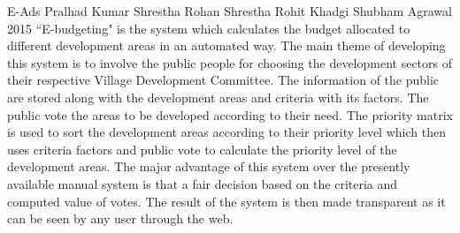 \begin{conf-abstract}[]
{E-Ads}
{
Pralhad Kumar Shrestha
Rohan Shrestha
Rohit Khadgi
Shubham Agrawal
}
{2015}
``E-budgeting" is the system which calculates the budget allocated to different development areas in an automated way. The main theme of developing this system is to involve the public people for choosing the development sectors of their respective Village Development Committee. The information of the public are stored along with the development areas and criteria with its factors. The public vote the areas to be developed according to their need. The priority matrix is used to sort the development areas according to their priority level which then uses criteria factors and public vote to calculate the priority level of the development areas. The major advantage of this system over the presently available manual system is that a fair decision based on the criteria and computed value of votes. The result of the system is then made transparent as it can be seen by any user through the web.
  \end{conf-abstract}